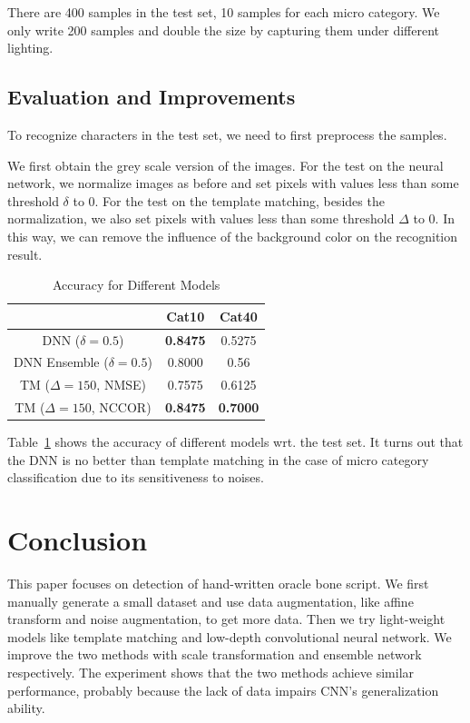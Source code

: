 \documentclass[journal]{IEEEtran}
\begin{document}
There are 400 samples in the test set, 10 samples for each micro category.
We only write 200 samples and double the size by capturing them under different lighting.

\subsection{Evaluation and Improvements}
To recognize characters in the test set, we need to first preprocess the samples.

We first obtain the grey scale version of the images.
For the test on the neural network, we normalize images as before and set pixels with values less than some threshold $\delta$ to 0.
For the test on the template matching, besides the normalization, we also set pixels with values less than some threshold $\Delta$ to 0.
In this way, we can remove the influence of the background color on the recognition result.

\begin{table}[h]
	\centering
	\caption{Accuracy for Different Models}
	\label{tab:result}
	\begin{tabular}{|c|c|c|}
		\hline
		                            & Cat10  & Cat40  \\\hline
		DNN ($\delta=0.5$)          & \textbf{0.8475} & 0.5275 \\\hline
		DNN Ensemble ($\delta=0.5$) & 0.8000 & 0.56   \\\hline
		TM ($\Delta=150$, NMSE)     & 0.7575 & 0.6125 \\\hline
		TM ($\Delta=150$, NCCOR)    & \textbf{0.8475} & \textbf{0.7000} \\\hline
	\end{tabular}
\end{table}

Table~\ref{tab:result} shows the accuracy of different models wrt. the test set.
It turns out that the DNN is no better than template matching in the case of micro category classification due to its sensitiveness to noises.

\section{Conclusion}
This paper focuses on detection of hand-written oracle bone script. We first manually generate a small dataset and use data augmentation, like affine transform and noise augmentation, to get more data. Then we try light-weight models like template matching and low-depth convolutional neural network. We improve the two methods with scale transformation and ensemble network respectively. The experiment shows that the two methods achieve similar performance, probably because the lack of data impairs CNN's generalization ability.





\end{document}
